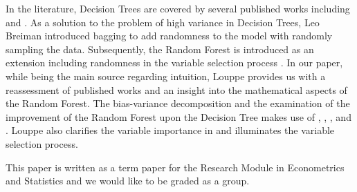 In the literature, 
Decision Trees are covered by several published works including 
\cite{breiman1984classification} and \cite{James2013}.
As a solution to the problem of high variance in Decision Trees, 
Leo Breiman introduced bagging to add randomness to the model 
with randomly sampling the data\cite{breiman1996bagging}. 
Subsequently, the Random Forest is introduced as an extension including
randomness in the variable selection process \cite{breiman2001random}. 
In our paper, while \cite{friedman2001elements} being the main source regarding intuition,
Louppe provides us with a reassessment of published works and an insight into 
the mathematical aspects of the Random Forest\cite{louppe2014understanding}.
The bias-variance decomposition and the examination of 
the improvement of the Random Forest upon the Decision Tree makes use of
\cite{james2003variance}, \cite{domingos2000decomposition}, \cite{friedman1997zeroLoss}, and \cite{kohavi1996bias}. 
Louppe also clarifies the variable importance in \cite{louppe2013understanding} and 
\cite{kohavi1997importance} illuminates the variable selection process.

This paper is written as a term paper for the Research Module in Econometrics and Statistics and 
we would like to be graded as a group.
